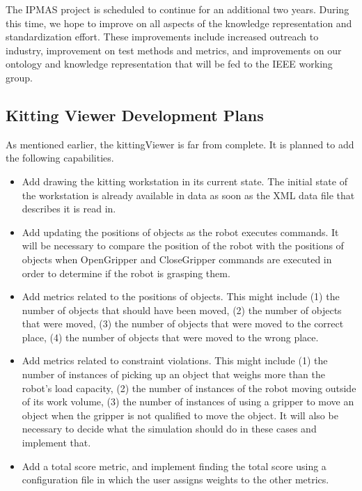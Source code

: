 The IPMAS project is scheduled to continue for an additional two years. During this time,
we hope to improve on all aspects of the knowledge representation and standardization
effort. These improvements include increased outreach to industry, improvement on
test methods and metrics, and improvements on our ontology and knowledge
representation that will be fed to the IEEE working group.

\subsection{Kitting Viewer Development Plans}

As mentioned earlier, the kittingViewer is far from complete. It is
planned to add the following capabilities.

\begin{itemize}

\item Add drawing the kitting workstation in its current state. The initial
  state of the workstation is already available in data as soon as the XML
  data file that describes it is read in.

\item Add updating the positions of objects as the robot executes commands.
  It will be necessary to compare the position of the robot with the
  positions of objects when OpenGripper and CloseGripper commands are
  executed in order to determine if the robot is grasping them.

\item Add metrics related to the positions of objects. This might include
  (1) the number of objects that should have been moved, (2) the number of
  objects that were moved, (3) the number of objects that were moved to the
  correct place, (4) the number of objects that were moved to the wrong
  place.

\item Add metrics related to constraint violations. This might include (1)
  the number of instances of picking up an object that weighs more than the
  robot's load capacity, (2) the number of instances of the robot moving
  outside of its work volume, (3) the number of instances of using a
  gripper to move an object when the gripper is not qualified to move the
  object. It will also be necessary to decide what the simulation should do
  in these cases and implement that.

\item Add a total score metric, and implement finding the total score using
  a configuration file in which the user assigns weights to the other
  metrics.
\end{itemize} 

